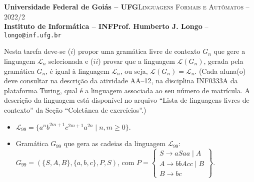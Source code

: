 \documentclass[12pt]{article}
\def\discente{Fulana(o) de tal}
\def\matricula{20010101}
\def\ua{12}
\def\myling{{99}} %
\begin{document}
 \begin{tcolorbox}[rounded corners, colback=blue!3, colframe=blue!40!black]
  \footnotesize\textbf{Universidade Federal de Goiás -- UFG}\hfill \textsc{Linguagens Formais e Autômatos -- 2022/2}\\
  \footnotesize\textbf{Instituto de Informática -- INF\hfill Prof. Humberto J. Longo} -- \scriptsize\texttt{longo@inf.ufg.br}
 \end{tcolorbox}\bigskip
%
\begin{tcolorbox}[rounded corners, colback=blue!2, colframe=blue!40!black, title=\textbf{Atividade AA-\ua}]
  Nesta tarefa deve-se ($i$) propor uma gramática livre de contexto $G_n$ que gere a linguagem $\mathcal{L}_n$ selecionada e ($ii$) provar que a linguagem $\mathcal{L}(G_n)$, gerada pela gramática $G_n$, é igual à linguagem $\mathcal{L}_n$, ou seja, $\mathcal{L}(G_n)=\mathcal{L}_n$. (Cada aluna(o) deve consultar na descrição da atividade AA--\ua, na disciplina INF0333A da plataforma Turing, qual é a linguagem associada ao seu número de matrícula. A descrição da linguagem está disponível no arquivo ``Lista de linguagens livres de contexto'' da Seção ``Coletânea de exercícios''.)
\end{tcolorbox}\bigskip

%
\begin{tcolorbox}[rounded corners, colback=yellow!5, colframe=red!40!black, title={\discente\ (\matricula)}]
\begin{itemize}
  \item $\mathcal{L}_{\myling} =  \{a^nb^{2m+1}c^{2m+1}a^{2n} \mid n,m \geqslant 0\}$.
  \item Gramática $G_{\myling}$ que gera as cadeias da linguagem $\mathcal{L}_{\myling}$:\\ $G_{\myling}=(\{S,A,B\},\{a,b,c\},P,S)$, com
  $
   P =
   \left\{\begin{array}{l}
    S\to aSaa\mid A\\
    A\to bbAcc\mid B\\
    B\to bc
   \end{array}\right\}.
  $
 \end{itemize}
\end{tcolorbox}\bigskip
\end{document}
